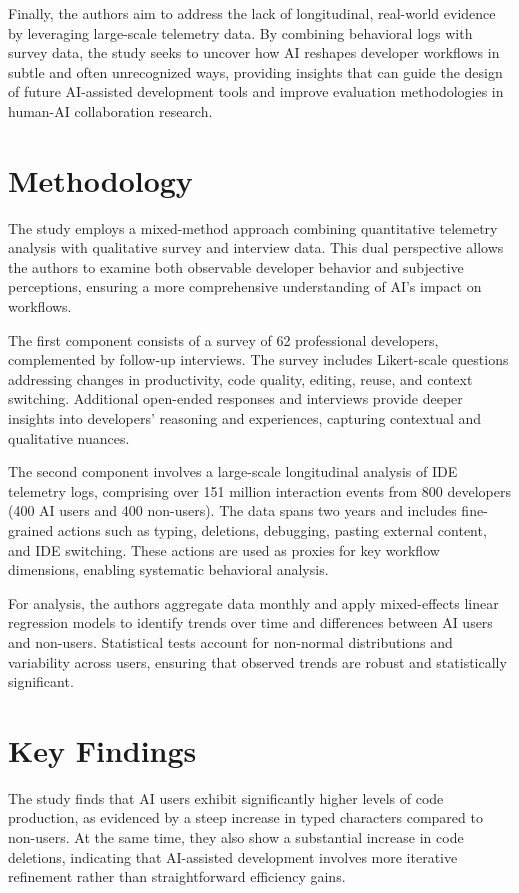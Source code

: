 Finally, the authors aim to address the lack of longitudinal, real-world evidence by leveraging large-scale telemetry data. By combining behavioral logs with survey data, the study seeks to uncover how AI reshapes developer workflows in subtle and often unrecognized ways, providing insights that can guide the design of future AI-assisted development tools and improve evaluation methodologies in human-AI collaboration research.

\section{Methodology}
The study employs a mixed-method approach combining quantitative telemetry analysis with qualitative survey and interview data. This dual perspective allows the authors to examine both observable developer behavior and subjective perceptions, ensuring a more comprehensive understanding of AI's impact on workflows.

The first component consists of a survey of 62 professional developers, complemented by follow-up interviews. The survey includes Likert-scale questions addressing changes in productivity, code quality, editing, reuse, and context switching. Additional open-ended responses and interviews provide deeper insights into developers' reasoning and experiences, capturing contextual and qualitative nuances.

The second component involves a large-scale longitudinal analysis of IDE telemetry logs, comprising over 151 million interaction events from 800 developers (400 AI users and 400 non-users). The data spans two years and includes fine-grained actions such as typing, deletions, debugging, pasting external content, and IDE switching. These actions are used as proxies for key workflow dimensions, enabling systematic behavioral analysis.

For analysis, the authors aggregate data monthly and apply mixed-effects linear regression models to identify trends over time and differences between AI users and non-users. Statistical tests account for non-normal distributions and variability across users, ensuring that observed trends are robust and statistically significant.

\section{Key Findings}
The study finds that AI users exhibit significantly higher levels of code production, as evidenced by a steep increase in typed characters compared to non-users. At the same time, they also show a substantial increase in code deletions, indicating that AI-assisted development involves more iterative refinement rather than straightforward efficiency gains.

